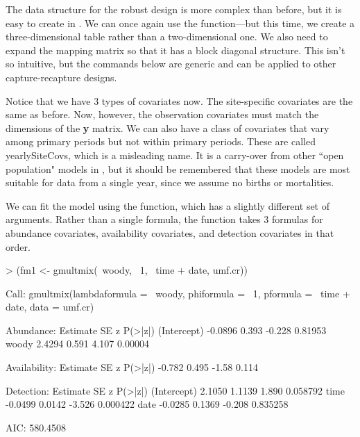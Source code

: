 \documentclass[a4paper]{article}
\renewenvironment{Schunk}{\vspace{\topsep}}{\vspace{\topsep}}
\begin{document}
The data structure for the robust design is more complex than before,
but it is easy to create in . We can once again use the
 function---but this time, we create a three-dimensional table
rather than a two-dimensional one. We also need to expand the
 mapping matrix so that it has a block diagonal
structure. This isn't so intuitive, but the
commands below are generic and can be applied to other
capture-recapture designs.

\begin{Schunk}
\end{Schunk}


Notice that we have 3 types of covariates now. The site-specific
covariates are the same as before. Now, however, the observation
covariates must match the dimensions of the {\bf y} matrix. We can
also have a class of covariates that vary among primary periods but
not within primary periods. These are called yearlySiteCovs, which is
a misleading name. It is a carry-over from other ``open population"
models in , but it should be remembered that these
models are most suitable for data from a single year, since we assume
no births or mortalities.

We can fit the model using the  function, which has a
slightly different set of arguments. Rather than a single formula, the
function takes 3 formulas for abundance covariates, availability
covariates, and detection covariates in that order.


\begin{Schunk}
\begin{Sinput}
> (fm1 <- gmultmix(~woody, ~1, ~time + date, umf.cr))
\end{Sinput}
\begin{Soutput}
Call:
gmultmix(lambdaformula = ~woody, phiformula = ~1, pformula = ~time + 
    date, data = umf.cr)

Abundance:
            Estimate    SE      z P(>|z|)
(Intercept)  -0.0896 0.393 -0.228 0.81953
woody         2.4294 0.591  4.107 0.00004

Availability:
 Estimate    SE     z P(>|z|)
   -0.782 0.495 -1.58   0.114

Detection:
            Estimate     SE      z  P(>|z|)
(Intercept)   2.1050 1.1139  1.890 0.058792
time         -0.0499 0.0142 -3.526 0.000422
date         -0.0285 0.1369 -0.208 0.835258

AIC: 580.4508 
\end{Soutput}
\end{Schunk}
\end{document}
